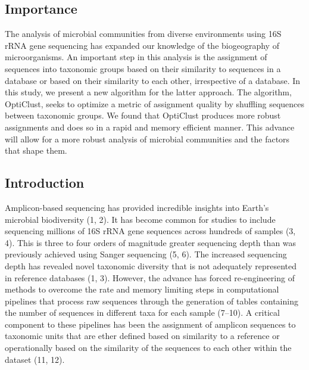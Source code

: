 \documentclass[11pt,]{article}
\begin{document}
\subsection{Importance}\label{importance}

The analysis of microbial communities from diverse environments using
16S rRNA gene sequencing has expanded our knowledge of the biogeography
of microorganisms. An important step in this analysis is the assignment
of sequences into taxonomic groups based on their similarity to
sequences in a database or based on their similarity to each other,
irrespective of a database. In this study, we present a new algorithm
for the latter approach. The algorithm, OptiClust, seeks to optimize a
metric of assignment quality by shuffling sequences between taxonomic
groups. We found that OptiClust produces more robust assignments and
does so in a rapid and memory efficient manner. This advance will allow
for a more robust analysis of microbial communities and the factors that
shape them.

\newpage

\subsection{Introduction}\label{introduction}

Amplicon-based sequencing has provided incredible insights into Earth's
microbial biodiversity (1, 2). It has become common for studies to
include sequencing millions of 16S rRNA gene sequences across hundreds
of samples (3, 4). This is three to four orders of magnitude greater
sequencing depth than was previously achieved using Sanger sequencing
(5, 6). The increased sequencing depth has revealed novel taxonomic
diversity that is not adequately represented in reference databases (1,
3). However, the advance has forced re-engineering of methods to
overcome the rate and memory limiting steps in computational pipelines
that process raw sequences through the generation of tables containing
the number of sequences in different taxa for each sample (7--10). A
critical component to these pipelines has been the assignment of
amplicon sequences to taxonomic units that are ether defined based on
similarity to a reference or operationally based on the similarity of
the sequences to each other within the dataset (11, 12).
\end{document}
